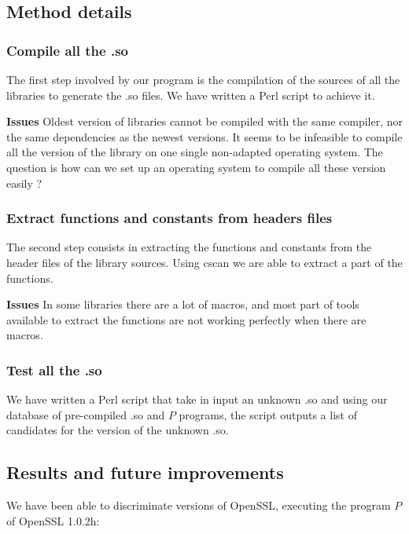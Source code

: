 \documentclass{article}
\begin{document}
    \subsection{Method details}
	\subsubsection{Compile all the .so}
	
	The first step involved by our program is the compilation of the sources of all the libraries to generate the .so files. We have written a Perl script to achieve it.
	
	\textbf{Issues} Oldest version of libraries cannot be compiled with the same compiler, nor the same dependencies as the newest versions. It seems to be infeasible to compile all the version of the library on one single non-adapted operating system. The question is how can we set up an operating system to compile all these version easily ?
	
   
   	\subsubsection{Extract functions and constants from headers files}
   	
   	The second step consists in extracting the functions and constants from the header files of the library sources. Using cscan we are able to extract a part of the functions.
   	
   	\textbf{Issues} In some libraries there are a lot of macros, and most part of tools available to extract the functions are not working perfectly when there are macros.   		
   	
   	
   	\subsubsection{Test all the .so}
   		
   		We have written a Perl script that take in input an unknown .so and using our database of pre-compiled .so and $P$ programs, the script outputs a list of candidates for the version of the unknown .so.

   	
   	\subsection{Results and future improvements}
   	
   		We have been able to discriminate versions of OpenSSL, executing the program $P$ of OpenSSL 1.0.2h:
\end{document}
